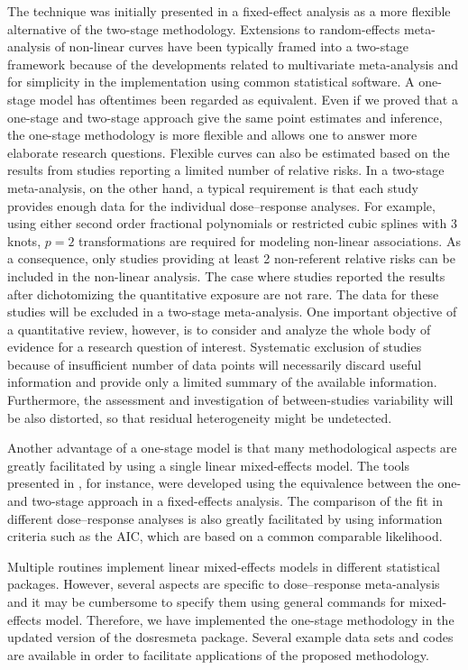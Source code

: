 \documentclass[11pt,a4paper,twoside,openany]{book}\usepackage{knitr}
\newcommand{\pkg}[1]{{\fontseries{b}\selectfont #1}}
\begin{document}
{{The technique was initially presented in a fixed-effect analysis as a more flexible alternative of the two-stage methodology. Extensions to random-effects meta-analysis of non-linear curves have been typically framed into a two-stage framework because of the developments related to multivariate meta-analysis and for simplicity in the implementation using common statistical software.  A one-stage model has oftentimes been regarded as equivalent. Even if we proved that a one-stage and two-stage approach give the same point estimates and inference, the one-stage methodology is more flexible and allows one to answer more elaborate research questions. Flexible curves can also be estimated based on the results from studies reporting a limited number of relative risks. In a two-stage meta-analysis, on the other hand, a typical requirement is that each study provides enough data for the individual dose--response analyses. For example, using either second order fractional polynomials or restricted cubic splines with 3 knots, $p = 2$ transformations are required for modeling non-linear associations. As a consequence, only studies providing at least 2 non-referent relative risks can be included in the non-linear analysis. The case where studies reported the results after dichotomizing the quantitative exposure are not rare. The data for these studies will be excluded in a two-stage meta-analysis. One important objective of a quantitative review, however, is to consider and analyze the whole body of evidence for a research question of interest. Systematic exclusion of studies because of insufficient number of data points will necessarily discard useful information and provide only a limited summary of the available information. Furthermore, the assessment and investigation of between-studies variability will be also distorted, so that residual heterogeneity might be undetected. 

Another advantage of a one-stage model is that many methodological aspects are greatly facilitated by using a single linear mixed-effects model. The tools presented in , for instance, were developed using the equivalence between the one- and two-stage approach in a fixed-effects analysis. The comparison of the fit in different dose--response analyses is also greatly facilitated by using information criteria such as the AIC, which are based on a common comparable likelihood.

Multiple routines implement linear mixed-effects models in different statistical packages. However, several aspects are specific to dose--response meta-analysis and it may be cumbersome to specify them using general commands for mixed-effects model. Therefore, we have implemented the one-stage methodology in the updated version of the \pkg{dosresmeta} package. Several example data sets and codes are available in order to facilitate applications of the proposed methodology.

}}
\end{document}
